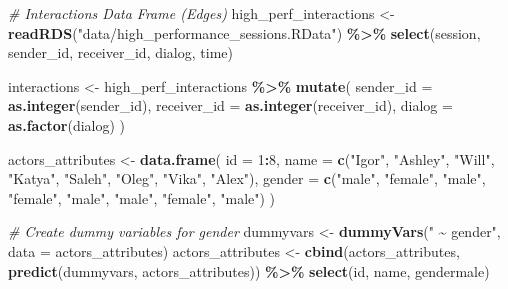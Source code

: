 \documentclass[
]{article}
\newenvironment{Shaded}{\begin{snugshade}}{\end{snugshade}}
\newcommand{\AttributeTok}[1]{\textcolor[rgb]{0.13,0.29,0.53}{#1}}
\newcommand{\CommentTok}[1]{\textcolor[rgb]{0.56,0.35,0.01}{\textit{#1}}}
\newcommand{\DecValTok}[1]{\textcolor[rgb]{0.00,0.00,0.81}{#1}}
\newcommand{\FunctionTok}[1]{\textcolor[rgb]{0.13,0.29,0.53}{\textbf{#1}}}
\newcommand{\NormalTok}[1]{#1}
\newcommand{\OtherTok}[1]{\textcolor[rgb]{0.56,0.35,0.01}{#1}}
\newcommand{\SpecialCharTok}[1]{\textcolor[rgb]{0.81,0.36,0.00}{\textbf{#1}}}
\newcommand{\StringTok}[1]{\textcolor[rgb]{0.31,0.60,0.02}{#1}}
\begin{document}
\begin{Shaded}
\begin{Highlighting}[]
\CommentTok{\# Interactions Data Frame (Edges)}
\NormalTok{high\_perf\_interactions }\OtherTok{\textless{}{-}} \FunctionTok{readRDS}\NormalTok{(}\StringTok{"data/high\_performance\_sessions.RData"}\NormalTok{) }\SpecialCharTok{\%\textgreater{}\%} 
  \FunctionTok{select}\NormalTok{(session, sender\_id, receiver\_id, dialog, time)}


\NormalTok{interactions }\OtherTok{\textless{}{-}}\NormalTok{ high\_perf\_interactions }\SpecialCharTok{\%\textgreater{}\%}
  \FunctionTok{mutate}\NormalTok{(}
    \AttributeTok{sender\_id =} \FunctionTok{as.integer}\NormalTok{(sender\_id),  }
    \AttributeTok{receiver\_id =} \FunctionTok{as.integer}\NormalTok{(receiver\_id), }
    \AttributeTok{dialog =} \FunctionTok{as.factor}\NormalTok{(dialog) }
\NormalTok{  )}



\NormalTok{actors\_attributes }\OtherTok{\textless{}{-}} \FunctionTok{data.frame}\NormalTok{(}
  \AttributeTok{id =} \DecValTok{1}\SpecialCharTok{:}\DecValTok{8}\NormalTok{,}
  \AttributeTok{name =} \FunctionTok{c}\NormalTok{(}\StringTok{"Igor"}\NormalTok{, }\StringTok{"Ashley"}\NormalTok{, }\StringTok{"Will"}\NormalTok{, }\StringTok{"Katya"}\NormalTok{, }\StringTok{"Saleh"}\NormalTok{, }\StringTok{"Oleg"}\NormalTok{, }\StringTok{"Vika"}\NormalTok{, }\StringTok{"Alex"}\NormalTok{),}
  \AttributeTok{gender =} \FunctionTok{c}\NormalTok{(}\StringTok{"male"}\NormalTok{, }\StringTok{"female"}\NormalTok{, }\StringTok{"male"}\NormalTok{, }\StringTok{"female"}\NormalTok{, }\StringTok{"male"}\NormalTok{, }\StringTok{"male"}\NormalTok{, }\StringTok{"female"}\NormalTok{, }\StringTok{"male"}\NormalTok{)}
\NormalTok{)}

\CommentTok{\# Create dummy variables for gender}
\NormalTok{dummyvars }\OtherTok{\textless{}{-}} \FunctionTok{dummyVars}\NormalTok{(}\StringTok{" \textasciitilde{} gender"}\NormalTok{, }\AttributeTok{data =}\NormalTok{ actors\_attributes)}
\NormalTok{actors\_attributes }\OtherTok{\textless{}{-}} \FunctionTok{cbind}\NormalTok{(actors\_attributes, }\FunctionTok{predict}\NormalTok{(dummyvars, actors\_attributes)) }\SpecialCharTok{\%\textgreater{}\%}
  \FunctionTok{select}\NormalTok{(id, name, gendermale)}
\end{Highlighting}
\end{Shaded}
\end{document}
